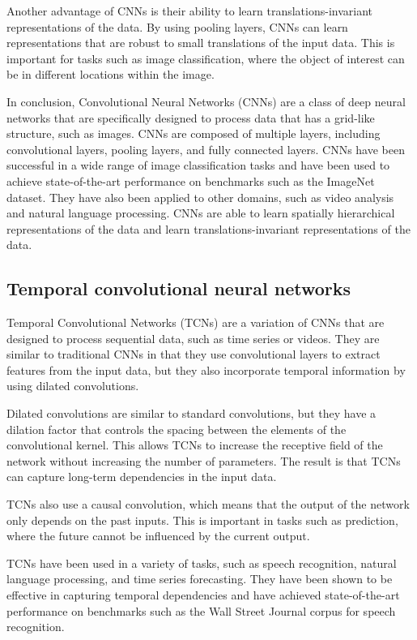 Another advantage of CNNs is their ability to learn translations-invariant representations of the data.
By using pooling layers, CNNs can learn representations that are robust to small translations of the input data.
This is important for tasks such as image classification, where the object of interest can be in different locations within the image.

In conclusion, Convolutional Neural Networks (CNNs) are a class of deep neural networks that are specifically designed to process data that has a grid-like structure, such as images.
CNNs are composed of multiple layers, including convolutional layers, pooling layers, and fully connected layers.
CNNs have been successful in a wide range of image classification tasks and have been used to achieve state-of-the-art performance on benchmarks such as the ImageNet dataset.
They have also been applied to other domains, such as video analysis and natural language processing.
CNNs are able to learn spatially hierarchical representations of the data and learn translations-invariant representations of the data.

\subsection{Temporal convolutional neural networks}

Temporal Convolutional Networks (TCNs) are a variation of CNNs that are designed to process sequential data, such as time series or videos.
They are similar to traditional CNNs in that they use convolutional layers to extract features from the input data, but they also incorporate temporal information by using dilated convolutions.

Dilated convolutions are similar to standard convolutions, but they have a dilation factor that controls the spacing between the elements of the convolutional kernel.
This allows TCNs to increase the receptive field of the network without increasing the number of parameters.
The result is that TCNs can capture long-term dependencies in the input data.

TCNs also use a causal convolution, which means that the output of the network only depends on the past inputs.
This is important in tasks such as prediction, where the future cannot be influenced by the current output.

TCNs have been used in a variety of tasks, such as speech recognition, natural language processing, and time series forecasting.
They have been shown to be effective in capturing temporal dependencies and have achieved state-of-the-art performance on benchmarks such as the Wall Street Journal corpus for speech recognition.

